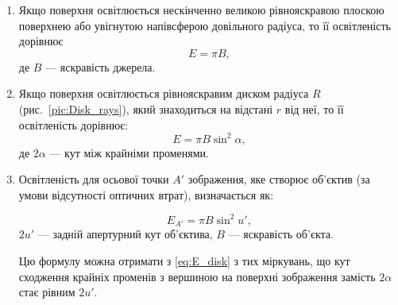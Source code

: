 \begin{enumerate}[label*={\textcolor{themecolordark}{\ding{90}}}]

	\item Якщо поверхня освітлюється нескінченно великою рівнояскравою
	      плоскою поверхнею або увігнутою напівсферою довільного радіуса, то її освітленість дорівнює
	      \begin{equation}\label{eq:E_inf_plane}
		      E = \pi B,
	      \end{equation}
	      де $B$ --- яскравість джерела.

	\item Якщо поверхня освітлюється  рівнояскравим диском радіуса $R$ (рис.~\ref{pic:Disk_rays}), який
	      знаходиться на відстані $r$ від неї, то її освітленість дорівнює:
	      \begin{equation}\label{eq:E_disk}
		      E = \pi B \sin^2\alpha,
	      \end{equation}
	      де $2\alpha$ --- кут між крайніми променями.

	      \begin{center}%
		      
		      \label{pic:Disk_rays}
	      \end{center}


	\item Освітленість для осьової точки $A'$ зображення, яке створює об’єктив (за умови відсутності оптичних втрат), визначається як:

	      \begin{equation}\label{eq:E_objective}
		      E_{A'} = \pi B \sin^2u',
	      \end{equation}
	      $2u'$ --- задній апертурний кут об’єктива, $B$ --- яскравість об’єкта.

	      Цю формулу можна отримати з \eqref{eq:E_disk} з тих міркувань, що кут сходження крайніх променів з вершиною на поверхні  зображення замість $2\alpha$ стає рівним $2u'$.

	      \begin{center}%
		      
	      \end{center}


\end{enumerate}
